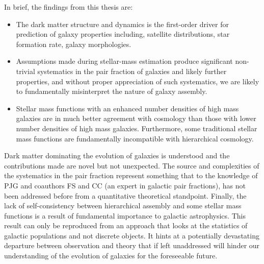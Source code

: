 In brief, the findings from this thesis are: 
\begin{itemize}
    \item The dark matter structure and dynamics is the first-order driver for prediction of galaxy properties including, satellite distributions, star formation rate, galaxy morphologies. 
    \item Assumptions made during stellar-mass estimation produce significant non-trivial systematics in the pair fraction of galaxies and likely further properties, and without proper appreciation of such systematics, we are likely to fundamentally misinterpret the nature of galaxy assembly. 
    \item Stellar mass functions with an enhanced number densities of high mass galaxies are in much better agreement with \LCDM cosmology than those with lower number densities of high mass galaxies. Furthermore, some traditional stellar mass functions are fundamentally incompatible with \LCDM hierarchical cosmology.
\end{itemize}

Dark matter dominating the evolution of galaxies is understood and the contributions made are novel but not unexpected. The source and complexities of the systematics in the pair fraction represent something that to the knowledge of PJG and coauthors FS and CC (an expert in galactic pair fractions), has not been addressed before from a quantitative theoretical standpoint. Finally, the lack of self-consistency between hierarchical \LCDM assembly and some stellar mass functions is a result of fundamental importance to galactic astrophysics. This result can only be reproduced from an approach that looks at the statistics of galactic populations and not discrete objects. It hints at a potentially devastating departure between observation and theory that if left unaddressed will hinder our understanding of the evolution of galaxies for the foreseeable future.
